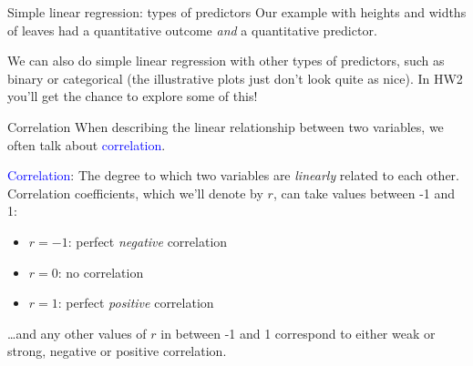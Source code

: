 \documentclass[10pt,t]{beamer}
\begin{document}
\begin{frame}{Simple linear regression: types of predictors}
Our example with heights and widths of leaves had a quantitative outcome \textit{and} a quantitative predictor. 

\vspace{0.3cm}

We can also do simple linear regression with other types of predictors, such as binary or categorical (the illustrative plots just don't look quite as nice). In HW2 you'll get the chance to explore some of this!
\end{frame}

\begin{frame}{Correlation}
When describing the linear relationship between two variables, we often talk about \textcolor{blue}{correlation}. 

\vspace{0.3cm}

\textcolor{blue}{Correlation}: The degree to which two variables are \textit{linearly} related to each other. Correlation coefficients, which we'll denote by $r$, can take values between -1 and 1:

\vspace{0.3cm} \pause
\begin{itemize}
	\item $r = -1$: perfect \textit{negative} correlation
	\item $r = 0$: no correlation
	\item $r = 1$: perfect \textit{positive} correlation
\end{itemize}

\vspace{0.3cm} \dots and any other values of $r$ in between -1 and 1 correspond to either weak or strong, negative or positive correlation.


\end{frame}
\end{document}
